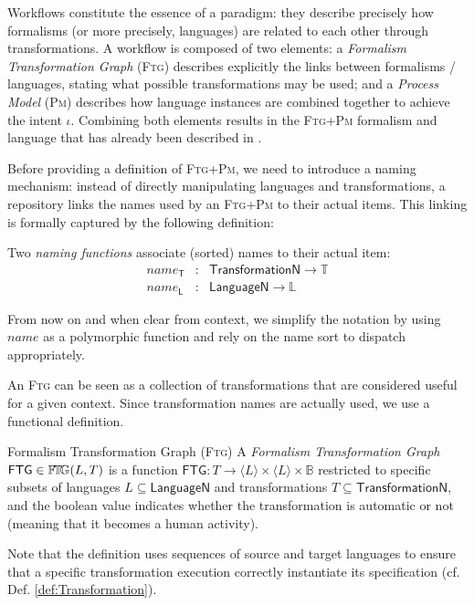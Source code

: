 Workflows constitute the essence of a paradigm: they describe precisely how 
formalisms (or more precisely, languages) are related to each other through 
transformations. A workflow is composed of two elements: a \emph{Formalism 
Transformation Graph} (\textsc{Ftg}) describes explicitly the links between 
formalisms / languages, stating what possible transformations may be used; and 
a \emph{Process Model} (\textsc{Pm}) describes how language instances are 
combined together to achieve the intent $\iota$. Combining both elements 
results in the \textsc{Ftg+Pm} formalism and language that has already been 
described in \cite{}.

Before providing a definition of \textsc{Ftg+Pm}, we need to introduce a naming 
mechanism: instead of directly manipulating languages and transformations, a 
repository links the names used by an \textsc{Ftg+Pm} to their actual items. 
This linking is formally captured by the following definition:



\begin{Definition}[Naming]
   Two \emph{naming functions} associate (sorted) names to their actual item:
   \begin{displaymath}
      \begin{array}{rcl}
         name_{\mathsf{T}} &\colon& \mathsf{TransformationN} \to \mathbb{T}\\
         name_{\mathsf{L}} &\colon& \mathsf{LanguageN} \to \mathbb{L}
      \end{array}
   \end{displaymath}
\end{Definition}
From now on and when clear from context, we simplify the notation by using 
$name$ as a polymorphic function and rely on the name sort to dispatch 
appropriately.

An \textsc{Ftg} can be seen as a collection of transformations that are 
considered useful for a given context. Since transformation names are actually 
used, we use a functional definition.
\begin{Definition}{Formalism Transformation Graph (\textsc{Ftg})}
   A \emph{Formalism Transformation Graph} $\mathsf{FTG} \in \mathbb{F}\!\mathbb{T}\!\mathbb{G}(L, T)$ is a 
function  $\mathsf{FTG} \colon T \to \langle L \rangle \times \langle L \rangle 
\times \mathbb{B}$ restricted to specific subsets of languages $L \subseteq 
\mathsf{LanguageN}$ and transformations $T\subseteq \mathsf{TransformationN}$, 
and the boolean value indicates whether the transformation is automatic or not 
(meaning that it becomes a human activity).
\end{Definition}
Note that the definition uses sequences of source and target languages to 
ensure that a specific transformation execution correctly instantiate its 
specification (cf. Def. \ref{def:Transformation}).


